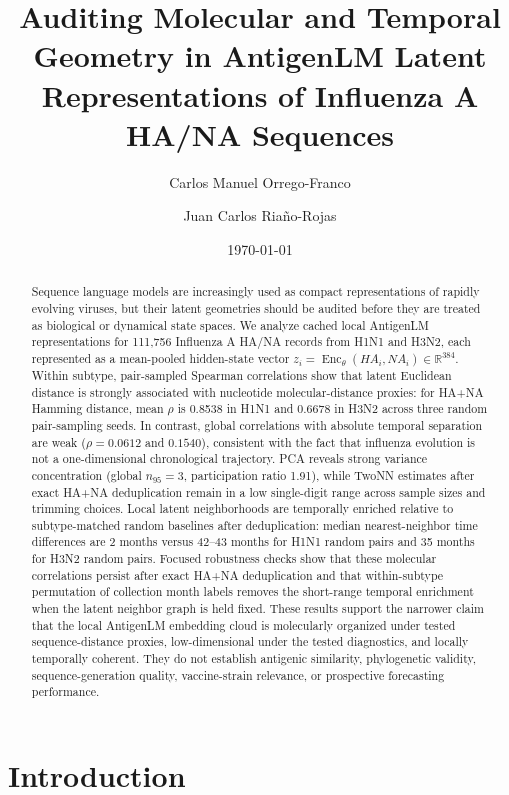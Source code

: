 \documentclass[11pt]{article}
\title{Auditing Molecular and Temporal Geometry in AntigenLM Latent Representations of Influenza A HA/NA Sequences}
\author{
Carlos Manuel Orrego-Franco
\and
Juan Carlos Riaño-Rojas
}
\date{\today}
\newcommand{\Enc}{\operatorname{Enc}}
\newcommand{\R}{\mathbb{R}}
\begin{document}
\maketitle

\begin{abstract}
Sequence language models are increasingly used as compact representations of rapidly evolving viruses, but their latent geometries should be audited before they are treated as biological or dynamical state spaces. We analyze cached local AntigenLM representations for 111,756 Influenza A HA/NA records from H1N1 and H3N2, each represented as a mean-pooled hidden-state vector $z_i=\Enc_{\theta}(HA_i,NA_i)\in\R^{384}$. Within subtype, pair-sampled Spearman correlations show that latent Euclidean distance is strongly associated with nucleotide molecular-distance proxies: for HA+NA Hamming distance, mean $\rho$ is 0.8538 in H1N1 and 0.6678 in H3N2 across three random pair-sampling seeds. In contrast, global correlations with absolute temporal separation are weak ($\rho=0.0612$ and $0.1540$), consistent with the fact that influenza evolution is not a one-dimensional chronological trajectory. PCA reveals strong variance concentration (global $n_{95}=3$, participation ratio 1.91), while TwoNN estimates after exact HA+NA deduplication remain in a low single-digit range across sample sizes and trimming choices. Local latent neighborhoods are temporally enriched relative to subtype-matched random baselines after deduplication: median nearest-neighbor time differences are 2 months versus 42--43 months for H1N1 random pairs and 35 months for H3N2 random pairs. Focused robustness checks show that these molecular correlations persist after exact HA+NA deduplication and that within-subtype permutation of collection month labels removes the short-range temporal enrichment when the latent neighbor graph is held fixed. These results support the narrower claim that the local AntigenLM embedding cloud is molecularly organized under tested sequence-distance proxies, low-dimensional under the tested diagnostics, and locally temporally coherent. They do not establish antigenic similarity, phylogenetic validity, sequence-generation quality, vaccine-strain relevance, or prospective forecasting performance.
\end{abstract}

\section{Introduction}
\end{document}
